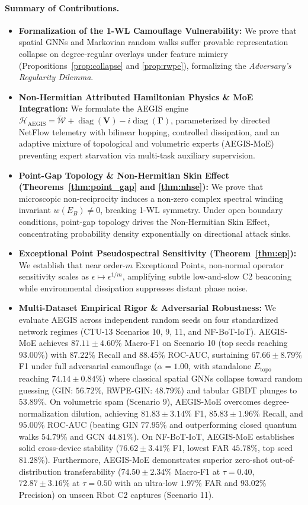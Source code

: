 \documentclass[10pt,twocolumn,letterpaper]{article}
\begin{document}
\paragraph{Summary of Contributions.}
\begin{itemize}
    \item \textbf{Formalization of the 1-WL Camouflage Vulnerability:} We prove that spatial GNNs and Markovian random walks suffer provable representation collapse on degree-regular overlays under feature mimicry (Propositions~\ref{prop:collapse} and \ref{prop:rwpe}), formalizing the \textit{Adversary's Regularity Dilemma}.
    \item \textbf{Non-Hermitian Attributed Hamiltonian Physics \& MoE Integration:} We formulate the AEGIS engine $\mathcal{H}_{\text{AEGIS}} = \tilde{\mathcal{W}} + \operatorname{diag}(\mathbf{V}) - i\operatorname{diag}(\boldsymbol{\Gamma})$, parameterized by directed NetFlow telemetry with bilinear hopping, controlled dissipation, and an adaptive mixture of topological and volumetric experts (AEGIS-MoE) preventing expert starvation via multi-task auxiliary supervision.
    \item \textbf{Point-Gap Topology \& Non-Hermitian Skin Effect (Theorems~\ref{thm:point_gap} and \ref{thm:nhse}):} We prove that microscopic non-reciprocity induces a non-zero complex spectral winding invariant $w(E_B) \ne 0$, breaking 1-WL symmetry. Under open boundary conditions, point-gap topology drives the Non-Hermitian Skin Effect, concentrating probability density exponentially on directional attack sinks.
    \item \textbf{Exceptional Point Pseudospectral Sensitivity (Theorem~\ref{thm:ep}):} We establish that near order-$m$ Exceptional Points, non-normal operator sensitivity scales as $\epsilon \mapsto \epsilon^{1/m}$, amplifying subtle low-and-slow C2 beaconing while environmental dissipation suppresses distant phase noise.
    \item \textbf{Multi-Dataset Empirical Rigor \& Adversarial Robustness:} We evaluate AEGIS across independent random seeds on four standardized network regimes (CTU-13 Scenarios 10, 9, 11, and NF-BoT-IoT). AEGIS-MoE achieves $\mathbf{87.11 \pm 4.60\%}$ Macro-F1 on Scenario 10 (top seeds reaching $93.00\%$) with $\mathbf{87.22\%}$ Recall and $\mathbf{88.45\%}$ ROC-AUC, sustaining $\mathbf{67.66 \pm 8.79\%}$ F1 under full adversarial camouflage ($\alpha = 1.00$, with standalone $E_{\text{topo}}$ reaching $\mathbf{74.14 \pm 0.84\%}$) where classical spatial GNNs collapse toward random guessing (GIN: $56.72\%$, RWPE-GIN: $48.79\%$) and tabular GBDT plunges to $53.89\%$. On volumetric spam (Scenario 9), AEGIS-MoE overcomes degree-normalization dilution, achieving $81.83 \pm 3.14\%$ F1, $85.83 \pm 1.96\%$ Recall, and $\mathbf{95.00\%}$ ROC-AUC (beating GIN $77.95\%$ and outperforming closed quantum walks $54.79\%$ and GCN $44.81\%$). On NF-BoT-IoT, AEGIS-MoE establishes solid cross-device stability ($76.62 \pm 3.41\%$ F1, lowest FAR $45.78\%$, top seed $81.28\%$). Furthermore, AEGIS-MoE demonstrates superior zero-shot out-of-distribution transferability ($\mathbf{74.50 \pm 2.34\%}$ Macro-F1 at $\tau=0.40$, $\mathbf{72.87 \pm 3.16\%}$ at $\tau=0.50$ with an ultra-low $\mathbf{1.97\%}$ FAR and $\mathbf{93.02\%}$ Precision) on unseen Rbot C2 captures (Scenario 11).

\end{itemize}
\end{document}
